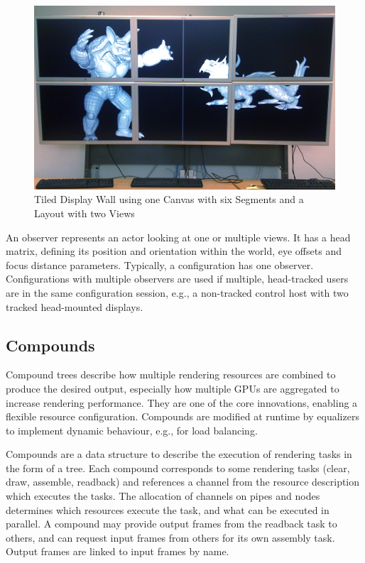 \begin{figure}[t]\center
 \includegraphics[width=\textwidth]{images/wallLayout.jpg}
 {\caption{\label{fDisplay}Tiled Display Wall using one Canvas with six Segments and a Layout with two Views}}
\end{figure}

An \textsf{observer} represents an actor looking at one or multiple views. It
has a head matrix, defining its position and orientation within the world, eye
offsets and focus distance parameters. Typically, a configuration has one
observer. Configurations with multiple observers are used if multiple,
head-tracked users are in the same configuration session, e.g., a non-tracked
control host with two tracked head-mounted displays.

\subsection{Compounds}

Compound trees describe how multiple rendering resources are combined to
produce the desired output, especially how multiple GPUs are aggregated to
increase rendering performance. They are one of the core innovations, enabling
a flexible resource configuration. Compounds are modified at runtime by
\textsf{equalizers} to implement dynamic behaviour, e.g., for load balancing.

Compounds are a data structure to describe the execution of rendering tasks in
the form of a tree. Each compound corresponds to some rendering tasks (clear,
draw, assemble, readback) and references a channel from the resource
description which executes the tasks. The allocation of channels on pipes and
nodes determines which resources execute the task, and what can be executed in
parallel. A compound may provide output frames from the readback task to
others, and can request input frames from others for its own assembly task.
Output frames are linked to input frames by name.

